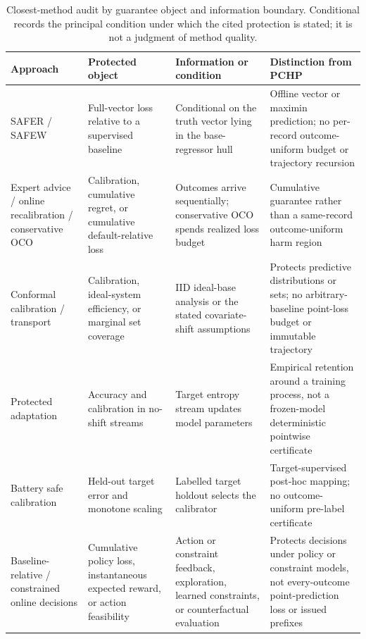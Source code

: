 \documentclass[11pt]{article}
\begin{document}
\begin{table}[p]
  \centering
  \caption{Closest-method audit by guarantee object and information boundary. Conditional records the principal condition under which the cited protection is stated; it is not a judgment of method quality.}
  \label{tab:novelty_audit}
  \footnotesize
  \renewcommand{\arraystretch}{0.94}
  \begin{tabularx}{\textwidth}{@{}>{\raggedright\arraybackslash}p{}>{\raggedright\arraybackslash}p{}>{\raggedright\arraybackslash}p{}>{\raggedright\arraybackslash}X@{}}
    \toprule
    Approach & Protected object & Information or condition & Distinction from PCHP \\
    \midrule
    SAFER / SAFEW \citep{li2017safer,li2021safeweak} & Full-vector loss relative to a supervised baseline & Conditional on the truth vector lying in the base-regressor hull & Offline vector or maximin prediction; no per-record outcome-uniform budget or trajectory recursion \\
    Expert advice / online recalibration / conservative OCO \citep{chernov2009evaluators,marx2025calibrated,deshpande2025calibrated,bernasconi2021conservative} & Calibration, cumulative regret, or cumulative default-relative loss & Outcomes arrive sequentially; conservative OCO spends realized loss budget & Cumulative guarantee rather than a same-record outcome-uniform harm region \\
    Conformal calibration / transport \citep{vovk2020conformal,tuwani2023transport,filgueira2026conformalized} & Calibration, ideal-system efficiency, or marginal set coverage & IID ideal-base analysis or the stated covariate-shift assumptions & Protects predictive distributions or sets; no arbitrary-baseline point-loss budget or immutable trajectory \\
    Protected adaptation \citep{bar2024protected} & Accuracy and calibration in no-shift streams & Target entropy stream updates model parameters & Empirical retention around a training process, not a frozen-model deterministic pointwise certificate \\
    Battery safe calibration \citep{nyachionjeka2026safecalibrated} & Held-out target error and monotone scaling & Labelled target holdout selects the calibrator & Target-supervised post-hoc mapping; no outcome-uniform pre-label certificate \\
    Baseline-relative / constrained online decisions \citep{moradipari2020stagewise,deb2025conservative,sridharan2025unknown,vaskov2024donoharm} & Cumulative policy loss, instantaneous expected reward, or action feasibility & Action or constraint feedback, exploration, learned constraints, or counterfactual evaluation & Protects decisions under policy or constraint models, not every-outcome point-prediction loss or issued prefixes \\

\end{tabularx}
\end{table}
\end{document}
